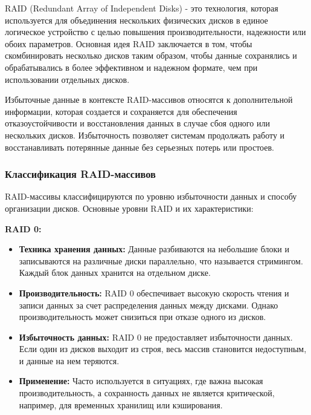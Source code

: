 \documentclass[10pt,a4paper,final]{article} %
\begin{document}
RAID (Redundant Array of Independent Disks) - это технология, которая используется для объединения нескольких физических дисков в единое логическое устройство с целью повышения производительности, надежности или обоих параметров. Основная идея RAID заключается в том, чтобы скомбинировать несколько дисков таким образом, чтобы данные сохранялись и обрабатывались в более эффективном и надежном формате, чем при использовании отдельных дисков.

Избыточные данные в контексте RAID-массивов относятся к дополнительной информации, которая создается и сохраняется для обеспечения отказоустойчивости и восстановления данных в случае сбоя одного или нескольких дисков. Избыточность позволяет системам продолжать работу и восстанавливать потерянные данные без серьезных потерь или простоев. 

\subsubsection{Классификация RAID-массивов}

RAID-массивы классифицируются по уровню избыточности данных и способу организации дисков. Основные уровни RAID и их характеристики:

{\large \textbf{RAID 0:}}
\begin{itemize}
	\item \textbf{Техника хранения данных:} Данные разбиваются на небольшие блоки и записываются на различные диски параллельно, что называется стримингом. Каждый блок данных хранится на отдельном диске.
	\item \textbf{Производительность:} RAID 0 обеспечивает высокую скорость чтения и записи данных за счет распределения данных между дисками. Однако производительность может снизиться при отказе одного из дисков.
	\item \textbf{Избыточность данных:} RAID 0 не предоставляет избыточности данных. Если один из дисков выходит из строя, весь массив становится недоступным, и данные на нем теряются.
	\item \textbf{Применение:} Часто используется в ситуациях, где важна высокая производительность, а сохранность данных не является критической, например, для временных хранилищ или кэширования.
\end{itemize}
\end{document}
